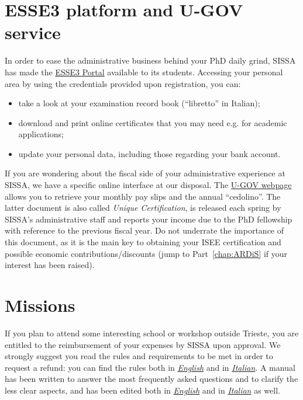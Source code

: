 \documentclass{sissavademecum}
\begin{document}
\section{ESSE3 platform and U-GOV service}

In order to ease the administrative business behind your PhD daily grind, SISSA has made the \href{https://sissa.esse3.cineca.it/Home.do}{ESSE3 Portal} available to its students. Accessing your personal area by using the credentials provided upon registration, you can:
\begin{itemize}
    \item take a look at your examination record book (``libretto'' in Italian);
    \item download and print online certificates that you may need e.g. for academic applications;
    \item update your personal data, including those regarding your bank account.
\end{itemize}
If you are wondering about the fiscal side of your administrative experience at SISSA, we have a specific online interface at our disposal. The \href{http://go.sissa.it/cedolini}{U-GOV webpage} allows you to retrieve your monthly pay slips and the annual ``cedolino''. The latter document is also called \textit{Unique Certification}, is released each spring by SISSA's administrative staff and reports your income due to the PhD fellowship with reference to the previous fiscal year. Do not underrate the importance of this document, as it is the main key to obtaining your ISEE certification and possible economic contributions/discounts (jump to Part~\ref{chap:ARDiS} if your interest has been raised).


\section{Missions}

If you plan to attend some interesting school or workshop outside Trieste, you are entitled to the reimbursement of your expenses by SISSA upon approval. We strongly suggest you read the rules and requirements to be met in order to request a refund: you can find the rules both in \href{https://services.sissa.it/mission/doc/English/ENGLISH_VERSION_REGOLAMENTO_MISSIONI.pdf}{\emph{English}} and in \href{https://services.sissa.it/mission/doc/Italian/2019_REGOLAMENTO_MISSIONI.pdf}{\emph{Italian}}. A manual has been written to answer the most frequently asked questions and to clarify the less clear aspects, and has been edited both in \href{https://services.sissa.it/mission/doc/English/ENGLISH_VERSION_USERS_GUIDE_C_i__PhD.pdf}{\emph{English}} and in \href{https://services.sissa.it/mission/doc/Italian/MANUALE_C_(i)__PHD.pdf}{\emph{Italian}} as well.
\end{document}

